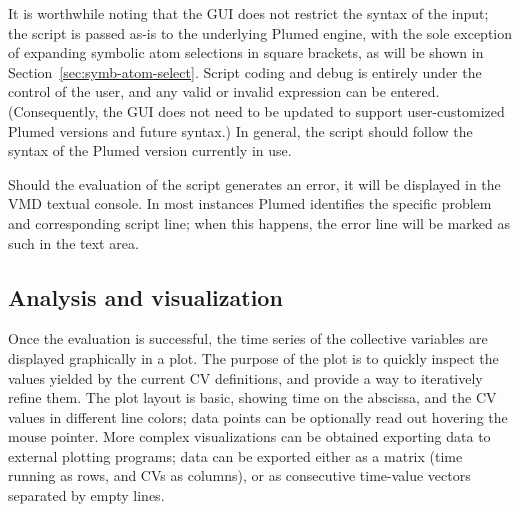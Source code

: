 \documentclass[preprint,12pt]{elsarticle}
\begin{document}

It is worthwhile noting that the GUI does not restrict the syntax of
the input; the script is passed as-is to the underlying Plumed engine,
with the sole exception of expanding symbolic atom selections in
square brackets, as will be shown in
Section~\ref{sec:symb-atom-select}.  Script coding and debug is
entirely under the control of the user, and any valid or invalid
expression can be entered.  (Consequently, the GUI does not need to be
updated to support user-customized Plumed versions and future syntax.)
In general, the script should follow the syntax of the Plumed version
currently in use.

Should the evaluation of the script generates an error, it will be
displayed in the VMD textual console.  In most instances Plumed
identifies the specific problem and corresponding script line; when this
happens, the error line will be marked as such
in the text area.



\subsection{Analysis and visualization}

Once the evaluation is successful, the time series of the collective
variables are displayed graphically in a plot.  The purpose of the
plot is to quickly inspect the values yielded by the current CV
definitions, and provide a way to iteratively refine them. The plot
layout is basic, showing time on the abscissa, and the CV values in
different line colors; data points can be optionally read out hovering the
mouse pointer.  More complex visualizations can be obtained exporting
data to external plotting programs; data can be exported 
either as a matrix (time running as rows, and CVs as
columns), or as consecutive time-value vectors separated by empty
lines.
\end{document}
